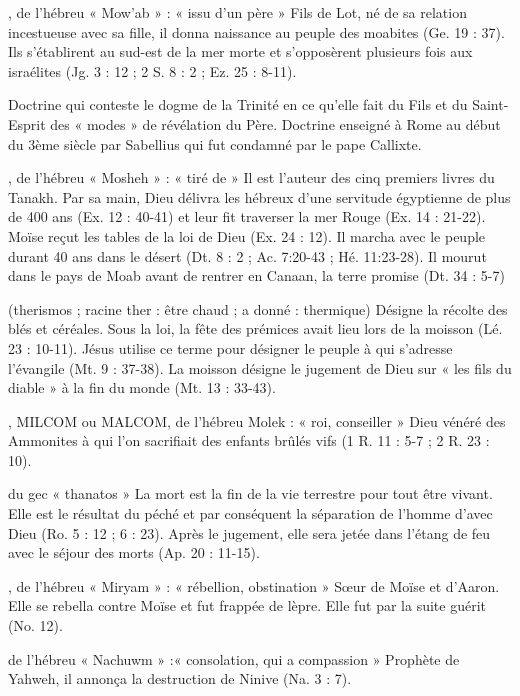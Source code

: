 \begin{multicols}{2}
, de l'hébreu « Mow'ab » : « issu d'un père »
Fils de Lot, né de sa relation incestueuse avec sa fille, il donna naissance au peuple des moabites (Ge. 19 : 37). Ils s'établirent au sud-est de la mer morte et s'opposèrent plusieurs fois aux israélites (Jg. 3 : 12 ; 2 S. 8 : 2 ; Ez. 25 : 8-11).


Doctrine qui conteste le dogme de la Trinité en ce qu'elle fait du Fils et du Saint-Esprit des « modes » de révélation du Père. Doctrine enseigné à Rome au début du 3ème siècle par Sabellius qui fut condamné par le pape Callixte.


, de l'hébreu « Mosheh » : « tiré de »
Il est l'auteur des cinq premiers livres du Tanakh.
Par sa main, Dieu délivra les hébreux d'une servitude égyptienne de plus de 400 ans (Ex. 12 : 40-41) et leur fit traverser la mer Rouge (Ex. 14 : 21-22). Moïse reçut les tables de la loi de Dieu (Ex. 24 : 12). Il marcha avec le peuple durant 40 ans dans le désert (Dt. 8 : 2 ; Ac. 7:20-43 ; Hé. 11:23-28). Il mourut dans le pays de Moab avant de rentrer en Canaan, la terre promise (Dt. 34 : 5-7)


(therismos ; racine ther : être chaud ; a donné : thermique)
Désigne la récolte des blés et céréales. Sous la loi, la fête des prémices avait lieu lors de la moisson (Lé. 23 : 10-11). Jésus utilise ce terme pour désigner le peuple à qui s'adresse l'évangile (Mt. 9 : 37-38). La moisson désigne le jugement de Dieu sur « les fils du diable » à la fin du monde (Mt. 13 : 33-43).


, MILCOM ou MALCOM, de l'hébreu Molek : « roi, conseiller »
Dieu vénéré des Ammonites à qui l'on sacrifiait des enfants brûlés vifs (1 R. 11 : 5-7 ; 2 R. 23 : 10).


du gec « thanatos »
La mort est la fin de la vie terrestre pour tout être vivant. Elle est le résultat du péché et par conséquent la séparation de l'homme d'avec Dieu (Ro. 5 : 12 ; 6 : 23). Après le jugement, elle sera jetée dans l'étang de feu avec le séjour des morts (Ap. 20 : 11-15).


, de l'hébreu « Miryam » : « rébellion, obstination »
Sœur de Moïse et d'Aaron. Elle se rebella contre Moïse et fut frappée de lèpre. Elle fut par la suite guérit (No. 12).


de l'hébreu « Nachuwm » :« consolation, qui a compassion »
Prophète de Yahweh, il annonça la destruction de Ninive (Na. 3 : 7).



\end{multicols}
